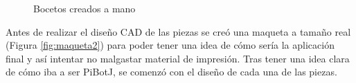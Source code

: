 \begin{figure}[ht!]
\begin{minipage}{0.5\linewidth}
	\end{minipage}
	\caption{Bocetos creados a mano}
	\label{fig:bocetos}
\end{figure}

Antes de realizar el diseño CAD de las piezas se creó una maqueta a tamaño real (Figura \ref{fig:maqueta2}) para poder tener una idea de cómo sería la aplicación final y así intentar no malgastar material de impresión. Tras tener una idea clara de cómo iba a ser PiBotJ, se comenzó con el diseño de cada una de las piezas.  



